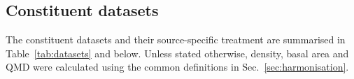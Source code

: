 \documentclass{myreport}
\begin{document}

\subsection{Constituent datasets}
\label{sec:constituentdatasets}


The constituent datasets and their source-specific treatment are summarised in Table~\ref{tab:datasets} and below. Unless stated otherwise, density, basal area and QMD were calculated using the common definitions in Sec.~\ref{sec:harmonisation}.
\end{document}
